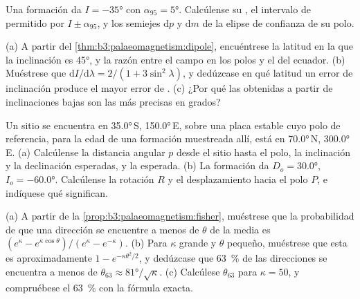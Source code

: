 \begin{exercise}[$\star\star$]\label{exo:b3:palaeomagnetism:9}
Una formación da $I = \ang{-35}$ con $\alpha_{95} = \ang{5}$. Calcúlense su
, el intervalo de  permitido por $I \pm \alpha_{95}$,
y los semiejes $\mathrm dp$ y $\mathrm dm$ de la elipse de confianza de su
polo.
\end{exercise}

\begin{exercise}[$\star\star\star$]\label{exo:b3:palaeomagnetism:10}
(a) A partir del \cref{thm:b3:palaeomagnetism:dipole}, encuéntrese la latitud en la que
la inclinación es \ang{45}, y la razón entre el campo en los polos y el del
ecuador. (b) Muéstrese que $\mathrm dI/\mathrm d\lambda = 2/(1 + 3\sin^2\lambda)$,
y dedúzcase en qué latitud un error de inclinación produce el mayor error de
. (c) ¿Por qué las  obtenidas a partir de inclinaciones bajas son las más
precisas en grados?
\end{exercise}

\begin{exercise}[$\star\star\star$]\label{exo:b3:palaeomagnetism:11}
Un sitio se encuentra en \ang{35.0}\,S, \ang{150.0}\,E, sobre una placa estable cuyo
polo de referencia, para la edad de una formación muestreada allí, está en \ang{70.0}\,N,
\ang{300.0}\,E. (a) Calcúlense la distancia angular $p$ desde el sitio hasta el polo,
la inclinación y la declinación esperadas, y la  esperada.
(b) La formación da $D_o = \ang{30.0}$, $I_o = \ang{-60.0}$. Calcúlense la
rotación $R$ y el desplazamiento hacia el polo $P$, e indíquese qué significan.
\end{exercise}

\begin{exercise}[$\star\star\star$]\label{exo:b3:palaeomagnetism:12}
(a) A partir de la \cref{prop:b3:palaeomagnetism:fisher}, muéstrese que la probabilidad de que
una dirección se encuentre a menos de $\theta$ de la media es $(e^\kappa -
e^{\kappa\cos\theta})/(e^\kappa - e^{-\kappa})$. (b) Para $\kappa$ grande y
$\theta$ pequeño, muéstrese que esta es aproximadamente $1 - e^{-\kappa\theta^2/2}$, y dedúzcase
que \qty{63}{\percent} de las direcciones se encuentra a menos de $\theta_{63} \approx
\ang{81}/\sqrt\kappa$. (c) Calcúlese $\theta_{63}$ para $\kappa = 50$, y compruébese el
\qty{63}{\percent} con la fórmula exacta.
\end{exercise}

